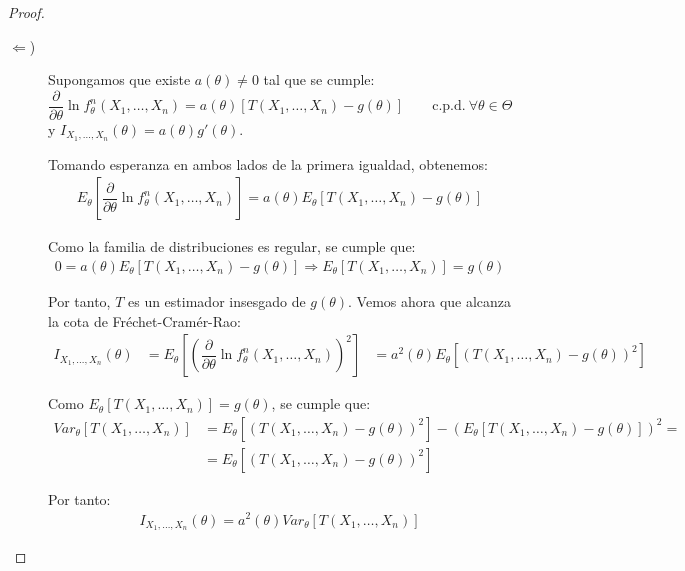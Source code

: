 \begin{teo}
\begin{proof}
\begin{description}
            \item[$\Longleftarrow$)] Supongamos que existe $a(\theta) \neq 0$ tal que se cumple:
            \begin{equation*}
                \dfrac{\partial}{\partial\theta}\ln f^n_\theta(X_1,\ldots,X_n)=a(\theta)[T(X_1,\ldots,X_n)-g(\theta)]\qquad \text{c.p.d.} \ \forall \theta \in \Theta
            \end{equation*}
            y $I_{X_1,\ldots,X_n}(\theta)=a(\theta)g'(\theta)$.

            Tomando esperanza en ambos lados de la primera igualdad, obtenemos:
            \begin{align*}
                E_\theta\left[\dfrac{\partial}{\partial\theta}\ln f^n_\theta(X_1,\ldots,X_n)\right] = a(\theta) E_\theta[T(X_1,\ldots,X_n)-g(\theta)]
            \end{align*}

            Como la familia de distribuciones es regular, se cumple que:
            \begin{align*}
                0 = a(\theta) E_\theta[T(X_1,\ldots,X_n)-g(\theta)] \Longrightarrow E_\theta[T(X_1,\ldots,X_n)] = g(\theta)
            \end{align*}

            Por tanto, $T$ es un estimador insesgado de $g(\theta)$. Vemos ahora que alcanza la cota de Fréchet-Cramér-Rao:
            \begin{align*}
                I_{X_1,\ldots,X_n}(\theta) &= E_\theta\left[\left(\dfrac{\partial}{\partial\theta}\ln f^n_\theta(X_1,\ldots,X_n)\right)^2\right] &= a^2(\theta) E_\theta\left[(T(X_1,\ldots,X_n)-g(\theta))^2\right]
            \end{align*}

            Como $E_\theta\left[T(X_1,\ldots,X_n)\right] = g(\theta)$, se cumple que:
            \begin{align*}
                Var_\theta[T(X_1,\ldots,X_n)] &= E_\theta\left[(T(X_1,\ldots,X_n)-g(\theta))^2\right] - (E_\theta[T(X_1,\ldots,X_n)-g(\theta)])^2 =\\&= E_\theta\left[(T(X_1,\ldots,X_n)-g(\theta))^2\right]
            \end{align*}

            Por tanto:
            \begin{align*}
                I_{X_1,\ldots,X_n}(\theta) = a^2(\theta) Var_\theta[T(X_1,\ldots,X_n)]
            \end{align*}


\end{description}
\end{proof}
\end{teo}
